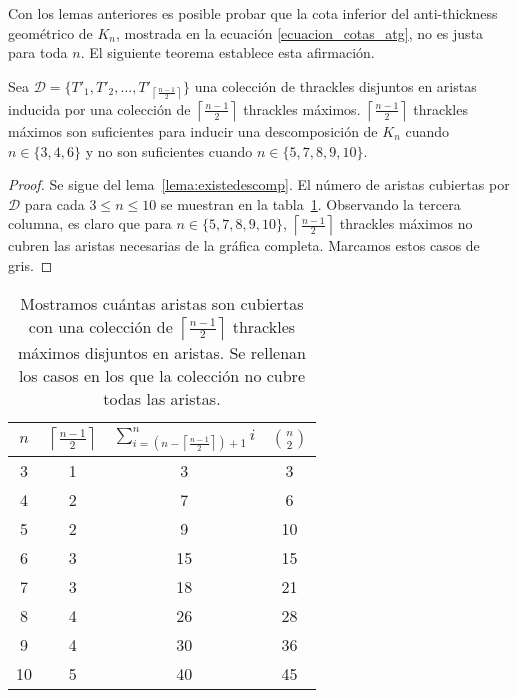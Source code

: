   Con los lemas anteriores es posible probar que la cota inferior del
  anti-thickness geométrico de $K_n$, mostrada en la ecuación
  \ref{ecuacion_cotas_atg}, no es justa para toda $n$. El siguiente teorema
  establece esta afirmación.
  \begin{theorem}\label{teo:cotainf}
  Sea $\mathcal{D}=\{T'_1,T'_2,\dots,T'_{\left\lceil\frac{n-1}{2}\right\rceil}\}$
  una colección de thrackles disjuntos en aristas inducida por una colección de
  $\left\lceil\frac{n-1}{2}\right\rceil$ thrackles máximos.
  $\left\lceil\frac{n-1}{2}\right\rceil$ thrackles máximos son
  suficientes para inducir una descomposición de $K_n$ cuando $n\in \{3,4,6\}$ y no son suficientes cuando $n\in\{5,7,8,9,10\}$.
  \end{theorem}
  \begin{proof}
    Se sigue del lema~\ref{lema:existedescomp}. El número de aristas cubiertas
    por $\mathcal{D}$ para cada $3\leq n \leq 10$ se muestran en la
    tabla~\ref{table:attrivialtight}. Observando la tercera columna, es claro que para
    $n\in\{5,7,8,9,10\}$, $\left\lceil\frac{n-1}{2}\right\rceil$ thrackles máximos no cubren las aristas
    necesarias de la gráfica completa. Marcamos estos casos de gris.
  \end{proof}

  \begin{table}[t]
    \centering
    \begin{tabular}{|c|c|c|c|}
      \hline
      $n$ & $\left\lceil\frac{n-1}{2}\right\rceil$ &
      $\sum^n_{i=\left(n-\left\lceil\frac{n-1}{2}\right\rceil\right) + 1}i$ &
      $\binom{n}{2}$\\[5pt] \hline\hline
      3   & 1  & 3 & 3 \\ \hline
      4   & 2  & 7 & 6 \\ \hline
      5   & 2  & \cellcolor{red!25}9 & 10 \\ \hline
      6   & 3  & 15 & 15 \\ \hline
      7   & 3  & \cellcolor{red!25}18 & 21 \\ \hline
      8   & 4  & \cellcolor{red!25}26 & 28 \\ \hline
      9   & 4  & \cellcolor{red!25}30 & 36 \\ \hline
      10  & 5  & \cellcolor{red!25}40 & 45 \\ \hline
    \end{tabular}
    \caption{ Mostramos cuántas aristas son cubiertas con una colección de
    $\left\lceil\frac{n-1}{2}\right\rceil$ thrackles máximos disjuntos en
    aristas. Se rellenan los casos en los que la colección no cubre todas las
    aristas. }
    \label{table:attrivialtight}
  \end{table}

